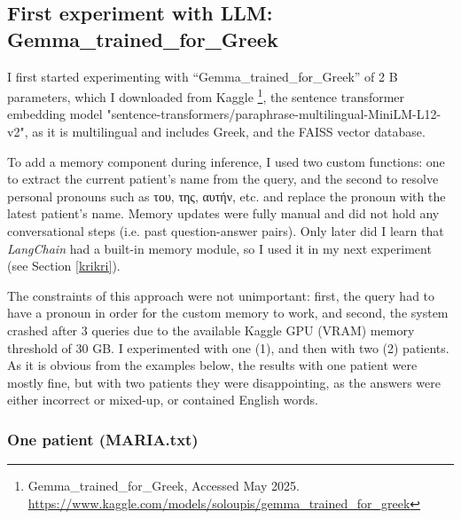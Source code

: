 \subsection{First experiment with LLM: Gemma\_trained\_for\_Greek}
I first started experimenting with “Gemma\_trained\_for\_Greek” of 2 B parameters, which I downloaded from Kaggle \footnote{Gemma\_trained\_for\_Greek, Accessed May 2025. \url{https://www.kaggle.com/models/soloupis/gemma\_trained\_for\_greek}}, the sentence transformer embedding model "sentence-transformers/paraphrase-multilingual-MiniLM-L12-v2", as it is multilingual and includes Greek, and the FAISS vector database. 

To add a memory component during inference, I used two custom functions: one to extract the current patient’s name from the query, and the second to resolve personal pronouns such as \textgreek{του, της, αυτήν}, etc. and replace the pronoun with the latest patient’s name. Memory updates were fully manual and did not hold any conversational steps (i.e. past question-answer pairs). Only later did I learn that \textit{LangChain} had a built-in memory module, so I used it in my next experiment (see Section \ref{krikri}).

The constraints of this approach were not unimportant: first, the query had to have a pronoun in order for the custom memory to work, and second, the system crashed after 3 queries due to the available Kaggle GPU (VRAM) memory threshold of 30 GB. I experimented with one (1), and then with two (2) patients. As it is obvious from the examples below, the results with one patient were mostly fine, but with two patients they were disappointing, as the answers were either incorrect or mixed-up, or contained English words.

\subsubsection{One patient (MARIA.txt)}

